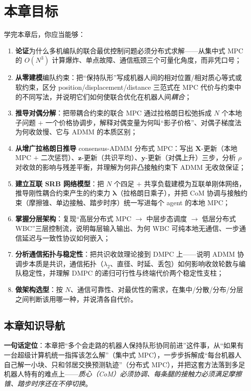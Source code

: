 \section*{本章目标}
学完本章后，你应当能够：
\begin{enumerate}
  \item \textbf{论证}为什么多机编队的联合最优控制问题必须分布式求解——从集中式 MPC 的 $O(N^3)$ 计算爆炸、单点故障、通信瓶颈三个可量化角度，而非凭口号；
  \item \textbf{从零建模}编队约束：把“保持队形”写成机器人间的相对位置/相对质心等式或软约束，区分 position/displacement/distance 三范式在 MPC 代价与约束中的不同写法，并说明它们如何使联合优化在机器人间\emph{耦合}；
  \item \textbf{推导对偶分解}：把带耦合约束的联合 MPC 通过拉格朗日松弛拆成 $N$ 个本地子问题 $+$ 一个价格协调步，解释对偶变量为何叫“影子价格”、对偶子梯度法为何收敛慢、它与 ADMM 的本质区别；
  \item \textbf{从增广拉格朗日推导} consensus-ADMM 分布式 MPC：写出 $\mathbf{X}$-更新（本地 MPC $+$ 二次惩罚）、$\mathbf{z}$-更新（共识平均）、$\mathbf{y}$-更新（对偶上升）三步，分析 $\rho$ 对收敛的影响与残差平衡，并理解为何非凸接触约束下 ADMM 无收敛保证；
  \item \textbf{建立互联 SRB 网络模型}：把 $N$ 个四足 $+$ 共享负载建模为互联单刚体网络，推导刚性耦合约束产生的约束力 $\boldsymbol{\lambda}$（拉格朗日乘子），并把 CoM 协调与接触约束（摩擦锥、单边接触、踏步时序）统一写进每个 agent 的本地 MPC；
  \item \textbf{掌握分层架构}：复现“高层分布式 MPC $\to$ 中层步态调度 $\to$ 低层分布式 WBC”三层控制流，说明每层输入输出、为何 WBC 可纯本地无通信、一步通信延迟与一致性协议如何嵌入；
  \item \textbf{分析通信拓扑与稳定性}：把共识收敛理论接到 DMPC 上——说明 ADMM 协调步本质是共识，通信拓扑（$\lambda_2$、直径、时延、丢包）如何影响收敛轮数与编队稳定性，并理解 DMPC 的递归可行性与终端代价两个稳定性支柱；
  \item \textbf{做架构选型}：按 $N$、通信可靠性、对最优性的需求，在集中/分散/分布/分层之间判断该用哪一种，并说清各自代价。
\end{enumerate}

\subsection*{本章知识导航}
\textbf{一句话定位}：本章把“多个会走路的机器人保持队形协同前进”这件事，从“如果有一台超级计算机统一指挥该怎么解”（集中式 MPC），一步步拆解成“每台机器人自己解一小块、只和邻居交换预测轨迹”（分布式 MPC），并把这套方法落到多足机器人特有的难点上——\emph{质心（CoM）必须协调、每条腿的接触力必须满足摩擦锥、踏步时序还在不停切换}。

